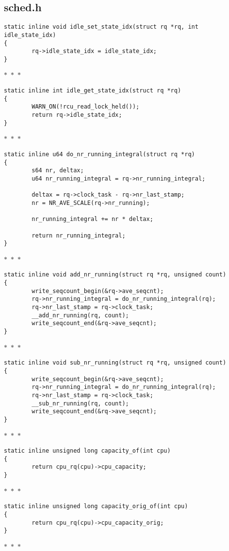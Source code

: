 \documentclass{article}
\newcommand{\divider}{{\begin{center}
  $\ast$~$\ast$~$\ast$
\end{center}}}
\begin{document}
\subsection{sched.h}

\begin{verbatim}
static inline void idle_set_state_idx(struct rq *rq, int idle_state_idx)
{
        rq->idle_state_idx = idle_state_idx;
}
\end{verbatim}
\divider
\begin{verbatim}
static inline int idle_get_state_idx(struct rq *rq)
{
        WARN_ON(!rcu_read_lock_held());
        return rq->idle_state_idx;
}
\end{verbatim}
\divider
\begin{verbatim}
static inline u64 do_nr_running_integral(struct rq *rq)
{
        s64 nr, deltax;
        u64 nr_running_integral = rq->nr_running_integral;

        deltax = rq->clock_task - rq->nr_last_stamp;
        nr = NR_AVE_SCALE(rq->nr_running);

        nr_running_integral += nr * deltax;

        return nr_running_integral;
}
\end{verbatim}
\divider
\begin{verbatim}
static inline void add_nr_running(struct rq *rq, unsigned count)
{
        write_seqcount_begin(&rq->ave_seqcnt);
        rq->nr_running_integral = do_nr_running_integral(rq);
        rq->nr_last_stamp = rq->clock_task;
        __add_nr_running(rq, count);
        write_seqcount_end(&rq->ave_seqcnt);
}
\end{verbatim}
\divider
\begin{verbatim}
static inline void sub_nr_running(struct rq *rq, unsigned count)
{
        write_seqcount_begin(&rq->ave_seqcnt);
        rq->nr_running_integral = do_nr_running_integral(rq);
        rq->nr_last_stamp = rq->clock_task;
        __sub_nr_running(rq, count);
        write_seqcount_end(&rq->ave_seqcnt);
}
\end{verbatim}
\divider
\begin{verbatim}
static inline unsigned long capacity_of(int cpu)
{
        return cpu_rq(cpu)->cpu_capacity;
}
\end{verbatim}
\divider
\begin{verbatim}
static inline unsigned long capacity_orig_of(int cpu)
{
        return cpu_rq(cpu)->cpu_capacity_orig;
}
\end{verbatim}
\divider
\end{document}
